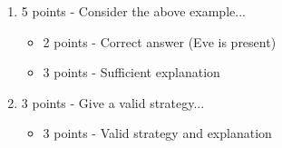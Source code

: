 \documentclass[12pt]{article}
\begin{document}
\begin{enumerate}[font=\bfseries]
    \item 5 points - Consider the above example...
        \begin{itemize}
            \item 2 points - Correct answer (Eve is present)
            \item 3 points - Sufficient explanation
        \end{itemize}
    \item 3 points - Give a valid strategy...
        \begin{itemize}
            \item 3 points - Valid strategy and explanation
        \end{itemize}
\end{enumerate}
\end{document}
